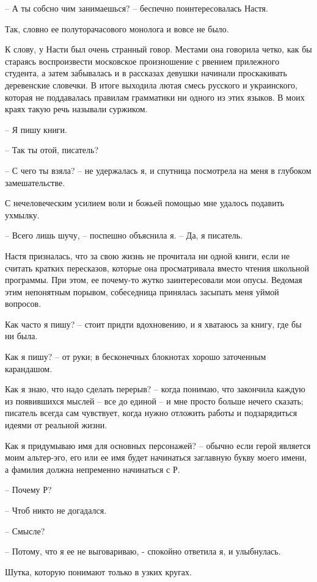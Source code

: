 \documentclass[
]{book}
\begin{document}
-- А ты собсно чим занимаешься? -- беспечно поинтересовалась Настя.

Так, словно ее полуторачасового монолога и вовсе не было.

К слову, у Насти был очень странный говор. Местами она говорила четко, как бы стараясь воспроизвести московское произношение с рвением прилежного студента, а затем забывалась и в рассказах девушки начинали проскакивать деревенские словечки. В итоге выходила лютая смесь русского и украинского, которая не поддавалась правилам грамматики ни одного из этих языков. В моих краях такую речь называли суржиком.

-- Я пишу книги.

-- Так ты отой, писатель?

-- С чего ты взяла? -- не удержалась я, и спутница посмотрела на меня в глубоком замешательстве.

С нечеловеческим усилием воли и божьей помощью мне удалось подавить ухмылку.

-- Всего лишь шучу, -- поспешно объяснила я. -- Да, я писатель.

Настя призналась, что за свою жизнь не прочитала ни одной книги, если не считать кратких пересказов, которые она просматривала вместо чтения школьной программы. При этом, ее почему-то жутко заинтересовали мои опусы. Ведомая этим непонятным порывом, собеседница принялась засыпать меня уймой вопросов.

Как часто я пишу? -- стоит придти вдохновению, и я хватаюсь за книгу, где бы ни была.

Как я пишу? -- от руки; в бесконечных блокнотах хорошо заточенным карандашом.

Как я знаю, что надо сделать перерыв? -- когда понимаю, что закончила каждую из появившихся мыслей -- все до единой -- и мне просто больше нечего сказать; писатель всегда сам чувствует, когда нужно отложить работы и подзарядиться идеями от реальной жизни.

Как я придумываю имя для основных персонажей? -- обычно если герой является моим альтер-эго, его или ее имя будет начинаться заглавную букву моего имени, а фамилия должна непременно начинаться с Р.

-- Почему Р?

-- Чтоб никто не догадался.

-- Смысле?

-- Потому, что я ее не выговариваю, - спокойно ответила я, и улыбнулась.

Шутка, которую понимают только в узких кругах.
\end{document}
